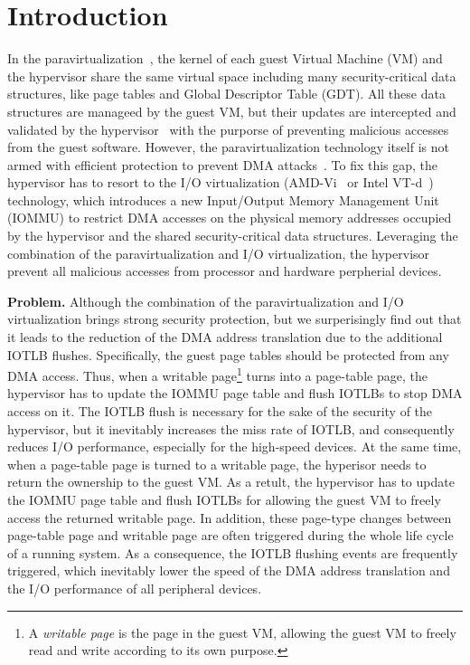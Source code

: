 \section{Introduction} \label{sec:intro}
In the paravirtualization~\cite{XEN-SOSP03,denali-paravirtualization}, the kernel of each guest Virtual Machine (VM) and the hypervisor share the same virtual space including many security-critical data structures, like page tables and Global Descriptor Table (GDT). All these data structures are manageed by the guest VM, but their updates are intercepted and validated by the hypervisor~\cite{XEN-SOSP03} with the purporse of preventing malicious accesses from the guest software.
However, the paravirtualization technology itself is not armed with efficient protection to prevent DMA attacks~\cite{disaggregation}.
To fix this gap, the hypervisor has to resort to the I/O virtualization (AMD-Vi~\cite{amdvt} or Intel VT-d~\cite{intelvt}) technology, which introduces a new Input/Output Memory Management Unit (IOMMU) to restrict DMA accesses on the physical memory addresses occupied by the hypervisor and the shared security-critical data structures. 
Leveraging the combination of the paravirtualization and I/O virtualization, the hypervisor prevent all malicious accesses from processor and hardware perpherial devices.

\textbf{Problem.} Although the combination of the paravirtualization and I/O virtualization brings strong security protection, but we surperisingly find out that it leads to the reduction of the DMA address translation due to the additional IOTLB flushes. 
Specifically, the guest page tables should be protected from any DMA access.
Thus, when a writable page\footnote{A \emph{writable page} is the page in the guest VM, allowing the guest VM to freely read and write according to its own purpose.} turns into a page-table page, the hypervisor has to update the IOMMU page table and flush IOTLBs to stop DMA access on it.
The IOTLB flush is necessary for the sake of the security of the hypervisor, but it inevitably increases the miss rate of IOTLB, and consequently reduces I/O performance, especially for the high-speed devices. 
At the same time, when a page-table page is turned to a writable page, the hyperisor needs to return the ownership to the guest VM.
As a retult, the hypervisor has to update the IOMMU page table and flush IOTLBs for allowing the guest VM to freely access the returned writable page. 
In addition, these page-type changes between page-table page and writable page are often triggered during the whole life cycle of a running system.
As a consequence, the IOTLB flushing events are frequently triggered, which inevitably lower the speed of the DMA address translation and the I/O performance of all peripheral devices.

